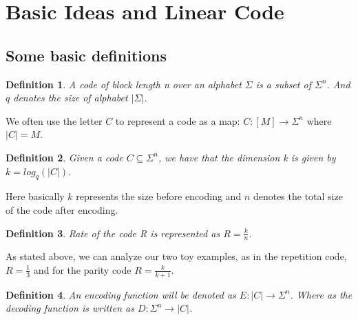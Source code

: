 \documentclass{article}
\newtheorem{Definition}{Definition}
\begin{document}
\section{Basic Ideas and Linear Code}
\subsection{Some basic definitions}
\begin{Definition}
A code of block length n over an alphabet $\Sigma$ is a subset of $\Sigma ^n$. And $q$ denotes the size of alphabet $|\Sigma|$. \cite{book}
\end{Definition}
\noindent We often use the letter $C$ to represent a code as a map: $C: [M] \rightarrow \Sigma^n$ where $|C| = M$.

\begin{Definition}
Given a code $C \subseteq \Sigma^n$, we have that the dimension k is given by $k = log_q(|C|)$.
\end{Definition}
\noindent Here basically $k$ represents the size before encoding and $n$ denotes the total size of the code after encoding. 
\begin{Definition}
Rate of the code R is represented as $R=\frac{k}{n}$.
\end{Definition}
\noindent As stated above, we can analyze our two toy examples, as in the repetition code, $R=\frac{1}{3}$ and for the parity code $R = \frac{k}{k+1}$.
\begin{Definition}
An encoding function will be denoted as $E:|C| \rightarrow \Sigma^n$. Where as the decoding function is written as $D:\Sigma^n \rightarrow |C|$.
\end{Definition}
\end{document}
